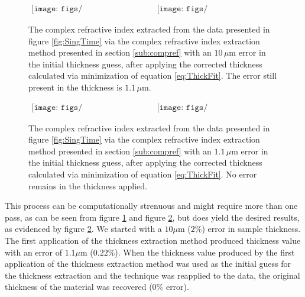 \begin{figure}[H]
                \begin{center}$
								\begin{array}{cc}
                \texttt{[image: figs/Single1\_1umErrorPass1\_n.png]}&
                \texttt{[image: figs/Single1\_1umErrorPass1\_k.png]}
								\end{array}$
								\end{center}
	\caption[Extracted complex refractive index for single layer isotropic with $10\,\mu$m error after one pass of thickness correction]{The complex refractive index extracted from the data presented in figure \ref{fig:SingTime} via the complex refractive index extraction method presented in section \ref{sub:compref} with an $10\,\mu$m error in the initial thickness guess, after applying the corrected thickness calculated via minimization of equation \ref{eq:ThickFit}. The error still present in the thickness is $1.1\,\mu$m.}
	\label{fig:SingExt_thErr_fix1}
\end{figure}

\begin{figure}[H]
                \begin{center}$
								\begin{array}{cc}
                \texttt{[image: figs/Single0umErrorPass2\_n.png]}&
                \texttt{[image: figs/Single0umErrorPass2\_k.png]}
								\end{array}$
								\end{center}
	\caption[Extracted complex refractive index for single layer isotropic with $10\,\mu$m error after second pass of thickness correction]{The complex refractive index extracted from the data presented in figure \ref{fig:SingTime} via the complex refractive index extraction method presented in section \ref{sub:compref} with an $1.1\,\mu$m error in the initial thickness guess, after applying the corrected thickness calculated via minimization of equation \ref{eq:ThickFit}. No error remains in the thickness applied.}
	\label{fig:SingExt_thErr_fix2}
\end{figure}

This process can be computationally strenuous and might require more than one pass, as can be seen from figure \ref{fig:SingExt_thErr_fix1} and figure \ref{fig:SingExt_thErr_fix2}, but does yield the desired results, as evidenced by figure \ref{fig:SingExt_thErr_fix2}. We started with a $10\mu$m ($2\%$) error in sample thickness. The first application of the thickness extraction method produced thickness value with an error of $1.1\mu$m ($0.22\%$). When the thickness value produced by the first application of the thickness extraction method was used as the initial guess for the thickness extraction and the technique was reapplied to the data, the original thickness of the material was recovered ($0\%$ error).

